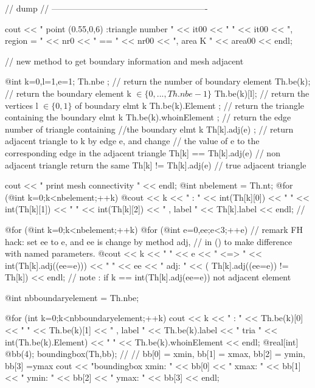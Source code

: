 \documentclass[a4paper,twoside,12pt]{book}
\def\n{\nabla}
\begin{document}
{ // dump  \hfilll
 // ------------------------------------------------------- \hfilll

  cout << "  point (0.55,0,6) :triangle number " << it00 << " " << it00
       << ", region = " << nr0 << " == " << nr00 << ",  area K " << area00 << endl;

  // new method to get boundary information and mesh adjacent  

 @int k=0,l=1,e=1;
  Th.nbe ; // return the number of boundary element  \hfilll
  Th.be(k);   // return the boundary element k $\in \{0,...,Th.nbe-1\}$   \hfilll
  Th.be(k)[l];   // return the vertices l $\in \{0,1\}$ of  boundary elmt k \hfilll
  Th.be(k).Element ;   // return the triangle containing the  boundary elmt k \hfilll
  Th.be(k).whoinElement ;   // return the edge number of triangle containing \hfilll
  //the  boundary elmt k
  Th[k].adj(e) ; // return adjacent triangle to k by edge e, and change \hfill
  // the value of e to the corresponding edge in the adjacent triangle
  Th[k] == Th[k].adj(e) // non adjacent triangle return the same
  Th[k] != Th[k].adj(e) // true adjacent triangle

  cout << " print mesh connectivity " << endl;
  @int nbelement = Th.nt;
  @for (@int k=0;k<nbelement;++k)
    @cout << k << " :  " << int(Th[k][0]) << " " << int(Th[k][1])
         << " " <<  int(Th[k][2])
         << " , label  " << Th[k].label << endl;
  //

  @for (@int k=0;k<nbelement;++k)
    @for (@int e=0,ee;e<3;++e)
      //  remark FH hack:  set ee to e, and ee is change by method adj,
      //  in () to make difference with  named parameters.
	    @cout << k <<  " " << e << " <=>  " << int(Th[k].adj((ee=e))) << " " << ee
	     << "  adj: " << ( Th[k].adj((ee=e)) != Th[k]) << endl;
      // note :     if k == int(Th[k].adj(ee=e)) not adjacent element


  @int nbboundaryelement = Th.nbe;

  @for (int k=0;k<nbboundaryelement;++k)
      cout << k << " : " <<  Th.be(k)[0] << " " << Th.be(k)[1] << " , label "
           << Th.be(k).label <<  " tria  " << int(Th.be(k).Element)
           << " " << Th.be(k).whoinElement <<  endl;
  @real[int] @bb(4);
  boundingbox(Th,bb); //    
  // bb[0] = xmin, bb[1] = xmax, bb[2] = ymin, bb[3] =ymax 
  cout << "\n boundingbox  xmin: " << bb[0] << " xmax: " << bb[1] 
                    << " ymin: " << bb[2] << " ymax: " << bb[3] << endl; 
}
\end{document}
